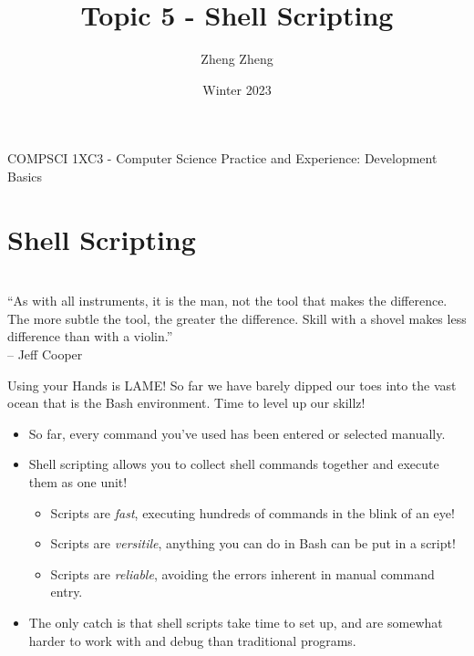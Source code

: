 \documentclass[11pt]{beamer}
\author{Zheng Zheng}
\title{Topic 5 - Shell Scripting}
\institute{McMaster University}
\date{Winter 2023}
\begin{document}
\begin{frame}
\center
COMPSCI 1XC3 - Computer Science Practice and Experience:
Development Basics
\titlepage
\end{frame}

\begin{frame}
\tableofcontents
\end{frame}

\section[Introduction]{Shell Scripting}
\begin{frame}
\center
{} \\
``As with all instruments, it is the man, not the tool that makes the difference. The more subtle the tool, the greater the difference. Skill with a shovel makes less difference than with a violin.''  \\
-- Jeff Cooper
\end{frame}

\begin{frame}{Using your Hands is LAME!}
So far we have barely dipped our toes into the vast ocean that is the Bash environment.  Time to level up our skillz!
\begin{itemize}
\item So far, every command you've used has been entered or selected manually.
\item Shell scripting allows you to collect shell commands together and execute them as one unit!  
	\begin{itemize}
	\item Scripts are \emph{fast}, executing hundreds of commands in the blink of an eye! 
	\item Scripts are \emph{versitile}, anything you can do in Bash can be put in a script! 
	\item Scripts are \emph{reliable}, avoiding the errors inherent in manual command entry.  
	\end{itemize}
\item The only catch is that shell scripts take time to set up, and are somewhat harder to work with and debug than traditional programs.  
\end{itemize}
\end{frame}
\end{document}
